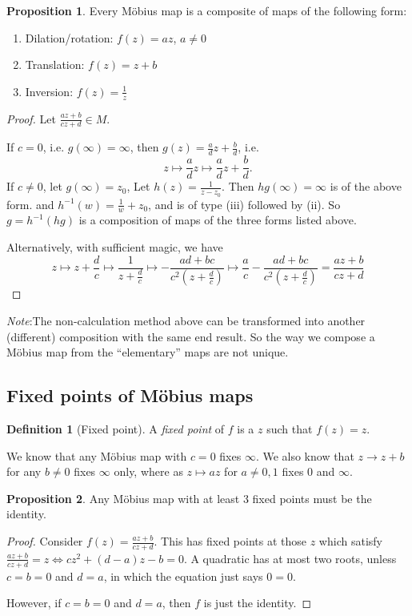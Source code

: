 \documentclass[a4paper]{article}
\theoremstyle{definition}
\newtheorem*{prop}{Proposition}
\newtheorem*{defi}{Definition}
\newcommand{\note}{\noindent \emph{Note}:\;}
\begin{document}
\begin{prop}
  Every M\"obius map is a composite of maps of the following form:
  \begin{enumerate}
  \item Dilation/rotation: $f(z) = az$, $a\not= 0$
  \item Translation: $f(z) = z + b$
  \item Inversion: $f(z) = \frac{1}{z}$
  \end{enumerate}
\end{prop}
\begin{proof}
  Let $\frac{az + b}{cz + d}\in M$.

  If $c = 0$, i.e. $g(\infty) = \infty$, then $g(z) = \frac{a}{d}z + \frac{b}{d}$, i.e.
  \[
  z\mapsto \frac{a}{d} z\mapsto \frac{a}{d}z + \frac{b}{d}.
  \]
  If $c\not= 0$, let $g(\infty)=z_0$, Let $h(z) = \frac{1}{z - z_0}$. Then $hg(\infty) = \infty$ is of the above form. and $h^{-1}(w) = \frac{1}{w} + z_0$, and is of type (iii) followed by (ii). So $g = h^{-1} (hg)$ is a composition of maps of the three forms listed above.

  Alternatively, with sufficient magic, we have
  \[
  z\mapsto z + \frac{d}{c} \mapsto \frac{1}{z + \frac{d}{c}} \mapsto -\frac{ad + bc}{c^2(z + \frac{d}{c})}\mapsto \frac{a}{c} -\frac{ad + bc}{c^2(z + \frac{d}{c})} = \frac{az + b}{cz + d}
  \]
\end{proof}
\note The non-calculation method above can be transformed into another (different) composition with the same end result. So the way we compose a M\"obius map from the ``elementary'' maps are not unique.

\subsection{Fixed points of M\"obius maps}
\begin{defi}[Fixed point]
  A \emph{fixed point} of $f$ is a $z$ such that $f(z) = z$.
\end{defi}

We know that any M\"obius map with $c = 0$ fixes $\infty$. We also know that $z\to z + b$ for any $b\not= 0$ fixes $\infty$ only, where as $z\mapsto az$ for $a\not= 0, 1$ fixes $0$ and $\infty$.

\begin{prop}
  Any M\"obius map with at least 3 fixed points must be the identity. 
\end{prop}

\begin{proof}
  Consider $f(z) = \frac{az + b}{cz + d}$. This has fixed points at those $z$ which satisfy $\frac{az + b}{cz + d} = z \Leftrightarrow cz^2 + (d - a)z - b = 0$. A quadratic has at most two roots, unless $c = b = 0$ and $d = a$, in which the equation just says $0 = 0$.

However, if $c = b= 0$ and $d = a$, then $f$ is just the identity. 
\end{proof}
\end{document}
